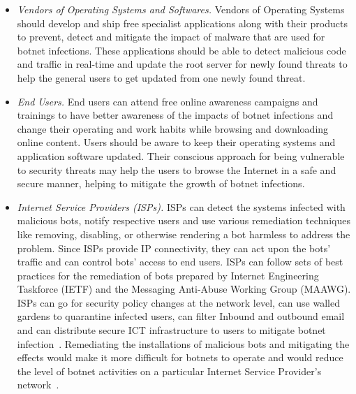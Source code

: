 \label{cap:sec1}
\begin{itemize}
\item \textit{Vendors of Operating Systems and Softwares.} Vendors of Operating Systems should develop and ship free specialist applications along with their products to prevent, detect and mitigate the impact of malware that are used for botnet infections. These applications should be able to detect malicious code and traffic in real-time and update the root server for newly found threats to help the general users to get updated from one newly found threat.
\item \textit{End Users.} End users can attend free online awareness campaigns and trainings to have better awareness of the impacts of botnet infections and change their operating and work habits while browsing and downloading online content. Users should be aware to keep their operating systems and application software updated. Their conscious approach for being vulnerable to security threats may help the users to browse the Internet in a safe and secure manner, helping to mitigate the growth of botnet infections.




\item \textit{Internet Service Providers (ISPs).}  ISPs can detect the systems infected with malicious bots, notify respective users and use various remediation techniques like removing, disabling, or otherwise rendering a bot harmless to address the problem. Since ISPs provide IP connectivity, they can act upon the bots' traffic and can control bots' access to end users. ISPs can follow sets of best practices for the remediation of bots prepared by Internet Engineering Taskforce (IETF) and the Messaging Anti-Abuse Working Group (MAAWG). ISPs can go for security policy changes at the network level, can use walled gardens to quarantine infected users, can filter Inbound and outbound email and  can distribute secure ICT infrastructure to users to mitigate botnet infection~\cite{charney2012collective}. Remediating the installations of malicious bots and mitigating the effects would make it more difficult for botnets to operate and would reduce the level of botnet activities on a particular Internet Service Provider's network~\cite{anderson2013measuring}. 



\end{itemize}
